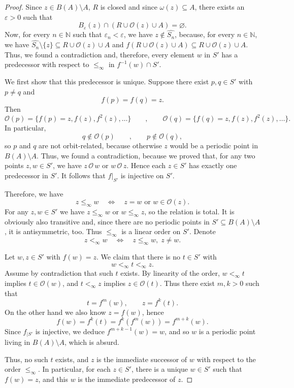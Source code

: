 \documentclass[10pt,a4paper]{amsart}
\begin{document}
\begin{proof}
Since $z\in B(A)\setminus A$, $R$ is closed and since $\omega(z)\subseteq A$, there exists an $\varepsilon>0$ such that
$$B_\varepsilon(z)\cap(R\cup\mathcal{O}(z)\cup A)=\varnothing.$$
Now, for every $n\in\mathbb N$ such that $\varepsilon_n<\varepsilon$, we have $z\notin\widehat{S_n}$, because, for every $n\in\mathbb N$, we have $\widehat{S_n}\setminus\{z\}\subseteq R\cup\mathcal{O}(z)\cup A$ and $f(R\cup\mathcal{O}(z)\cup A)\subseteq R\cup\mathcal{O}(z)\cup A$. Thus, we found a contradiction and, therefore, every element $w$ in $S'$ has a predecessor with respect to $\le_\infty$ in $f^{-1}(w)\cap S'$.

We first show that this predecessor is unique. Suppose there exist $p,q\in S'$ with $p\neq q$ and
$$
f(p)=f(q)=z.
$$
Then
$$
\mathcal{O}(p)=\{f(p)=z,f(z),f^2(z),\dots\}\qquad ,\qquad 
\mathcal{O}(q)=\{f(q)=z,f(z),f^2(z),\dots\}.
$$
In particular,
$$
q\notin\mathcal{O}(p)\qquad ,\qquad p\notin\mathcal{O}(q),
$$
so $p$ and $q$ are not orbit-related, because otherwise $z$ would be a periodic point in $B(A)\setminus A$. Thus, we found a contradiction, because we proved that, for any two points $z,w\in S'$, we have $z\,\mathcal{O}\,w$ or $w\,\mathcal{O}\,z$. Hence each $z\in S'$ has exactly one predecessor in $S'$. It follows that $f|_{S'}$ is injective on $S'$.


Therefore, we have
$$
z\le_\infty w \quad\Longleftrightarrow\quad z=w \text{ or } w\in\mathcal{O}(z).
$$
For any $z,w\in S'$ we have $z\le_\infty w$ or $w\le_\infty z$, so the relation is total. It is obviously also transitive and, since there are no periodic points in $S'\subseteq B(A)\setminus A$, it is antisymmetric, too.  Thus $\le_\infty$ is a linear order on $S'$. Denote
$$
z<_\infty w \quad\Longleftrightarrow\quad z\le_\infty w,\;z\neq w.
$$

Let $w,z\in S'$ with $f(w)=z$. We claim that there is no $t\in S'$ with
$$
w<_\infty t<_\infty z.
$$
Assume by contradiction that such $t$ exists. By linearity of the order, $w<_\infty t$ implies $t\in\mathcal{O}(w)$, and $t<_\infty z$ implies $z\in\mathcal{O}(t)$. Thus there exist $m,k>0$ such that
$$
t=f^m(w),\qquad z=f^k(t).
$$
On the other hand we also know $z=f(w)$, hence
$$
f(w)=f^k(t)=f^k(f^m(w))=f^{m+k}(w).
$$
Since $f_{|S'}$ is injective, we deduce $f^{m+k-1}(w)=w$, and so $w$ is a periodic point living in $B(A)\setminus A$, which is absurd.

Thus, no such $t$ exists, and $z$ is the immediate successor of $w$ with respect  to the order $\le_\infty$. In particular, for each $z\in S'$, there is a unique $w\in S'$ such that $f(w)=z$, and this $w$ is the immediate predecessor of $z$.


\end{proof}
\end{document}
